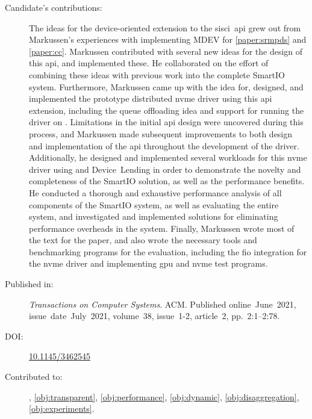 \begin{description}
	\item[Candidate's contributions:]
		The ideas for the device-oriented extension to the \acrshort{sisci}~\acrshort{api} grew out from Markussen's experiences with implementing MDEV for \cref{paper:srmpds} and \cref{paper:cc}.
		Markussen contributed with several new ideas for the design of this \acrshort{api}, and implemented these.
		He collaborated on the effort of combining these ideas with previous work into the complete SmartIO system. 
		Furthermore, Markussen came up with the idea for, designed, and implemented the prototype distributed \acrshort{nvme} driver using this \acrshort{api} extension, 
		including the queue offloading idea and support for running the driver on .
		Limitations in the initial \acrshort{api} design were uncovered during this process, and Markussen made subsequent improvements to both design and implementation of the \acrshort{api} throughout the development of the driver.
		Additionally, he designed and implemented several workloads for this \acrshort{nvme} driver using  and Device~Lending
		in order to demonstrate the novelty and completeness of the SmartIO solution, as well as the performance benefits.
		He conducted a thorough and exhaustive performance analysis of all components of the SmartIO system,
		as well as evaluating the entire system, and investigated and implemented solutions for eliminating performance overheads in the system.
		Finally, Markussen wrote most of the text for the paper, and also wrote the necessary tools and benchmarking programs for the evaluation,
		including the \acrshort{fio} integration for the \acrshort{nvme} driver and implementing \acrshort{gpu} and \acrshort{nvme} test programs.
		

	\item[Published in:]
		\emph{Transactions on Computer Systems}. ACM.
		Published online~June~2021,
		issue~date~July~2021, 
		volume~38, issue~1-2, article~2, pp.~2:1--2:78.

	\item[DOI:] \href{https://doi.org/10.1145/3462545}{10.1145/3462545}

	\item[Contributed to:]
		, \cref{obj:transparent}, \cref{obj:performance}, \cref{obj:dynamic}, \cref{obj:disaggregation}, \cref{obj:experiments}.

\end{description}

